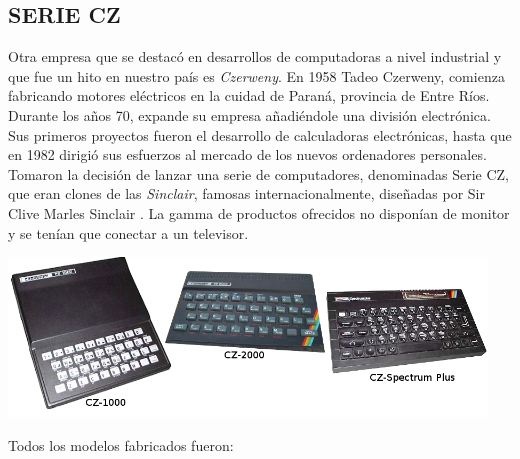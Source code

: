 \documentclass[%
  	final,
%
	notitlepage,
	narroweqnarray,
	inline,
 	twoside,
	]{ieee}
\begin{document}
\subsection*{SERIE CZ}

Otra empresa que se destac\'o en desarrollos de computadoras a nivel industrial y que fue un hito en nuestro pa\'is es \textit{Czerweny}. En 1958 Tadeo Czerweny, comienza fabricando motores el\'ectricos en la cuidad de Paran\'a, provincia de Entre R\'ios. Durante los a\~nos 70, expande su empresa a\~nadi\'endole una divisi\'on electr\'onica. Sus primeros proyectos fueron el desarrollo de calculadoras electr\'onicas, hasta que en 1982 dirigi\'o sus esfuerzos al mercado de los nuevos ordenadores personales. Tomaron la decisi\'on de lanzar una serie de computadores, denominadas Serie CZ\cite{czerweny}, que eran clones de las \textit{Sinclair}, famosas internacionalmente, dise\~nadas por Sir Clive Marles Sinclair \cite{sinclair}.
La gamma de productos ofrecidos no dispon\'ian de monitor y se ten\'ian que conectar a un televisor.\\  

\begin{center}\includegraphics[width=360pt, height=120pt]{serieCZ.png}\end{center}
Todos los modelos fabricados fueron:\\
\end{document}
